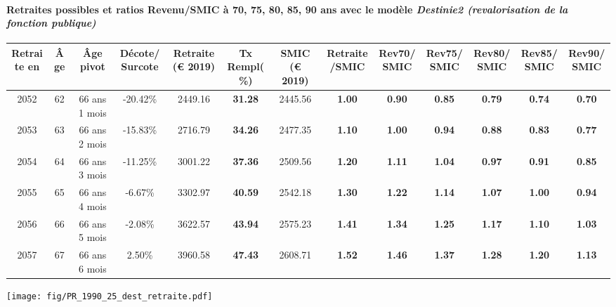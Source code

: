 \paragraph{Retraites possibles et ratios Revenu/SMIC à 70, 75, 80, 85, 90 ans avec le modèle \emph{Destinie2 (revalorisation de la fonction publique)}}  
 
{ \scriptsize \begin{center} 
\begin{tabular}[htb]{|c|c||c|c||c|c||c||c|c|c|c|c|c|} 
\hline 
 Retraite en &  Âge &  Âge pivot &  Décote/Surcote &  Retraite (\euro{} 2019) &  Tx Rempl(\%) &  SMIC (\euro{} 2019) &  Retraite/SMIC &  Rev70/SMIC &  Rev75/SMIC &  Rev80/SMIC &  Rev85/SMIC &  Rev90/SMIC \\ 
\hline \hline 
 2052 &  62 &  66 ans 1 mois &  -20.42\% &  2449.16 &  {\bf 31.28} &  2445.56 &  {\bf 1.00} &  {\bf {\color{red} 0.90}} &  {\bf {\color{red} 0.85}} &  {\bf {\color{red} 0.79}} &  {\bf {\color{red} 0.74}} &  {\bf {\color{red} 0.70}} \\ 
\hline 
 2053 &  63 &  66 ans 2 mois &  -15.83\% &  2716.79 &  {\bf 34.26} &  2477.35 &  {\bf 1.10} &  {\bf 1.00} &  {\bf {\color{red} 0.94}} &  {\bf {\color{red} 0.88}} &  {\bf {\color{red} 0.83}} &  {\bf {\color{red} 0.77}} \\ 
\hline 
 2054 &  64 &  66 ans 3 mois &  -11.25\% &  3001.22 &  {\bf 37.36} &  2509.56 &  {\bf 1.20} &  {\bf 1.11} &  {\bf 1.04} &  {\bf {\color{red} 0.97}} &  {\bf {\color{red} 0.91}} &  {\bf {\color{red} 0.85}} \\ 
\hline 
 2055 &  65 &  66 ans 4 mois &  -6.67\% &  3302.97 &  {\bf 40.59} &  2542.18 &  {\bf 1.30} &  {\bf 1.22} &  {\bf 1.14} &  {\bf 1.07} &  {\bf 1.00} &  {\bf {\color{red} 0.94}} \\ 
\hline 
 2056 &  66 &  66 ans 5 mois &  -2.08\% &  3622.57 &  {\bf 43.94} &  2575.23 &  {\bf 1.41} &  {\bf 1.34} &  {\bf 1.25} &  {\bf 1.17} &  {\bf 1.10} &  {\bf 1.03} \\ 
\hline 
 2057 &  67 &  66 ans 6 mois &  2.50\% &  3960.58 &  {\bf 47.43} &  2608.71 &  {\bf 1.52} &  {\bf 1.46} &  {\bf 1.37} &  {\bf 1.28} &  {\bf 1.20} &  {\bf 1.13} \\ 
\hline 
\hline 
\end{tabular} 
\end{center} } 

 \begin{center}\texttt{[image: fig/PR\_1990\_25\_dest\_retraite.pdf]}\end{center} \label{fig/PR_1990_25_dest_retraite.pdf} 

